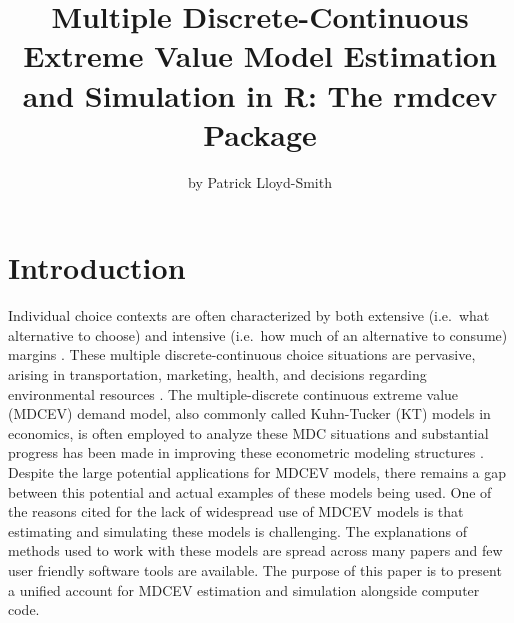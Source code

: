 \title{Multiple Discrete-Continuous Extreme Value Model Estimation and
Simulation in R: The rmdcev Package}
\author{by Patrick Lloyd-Smith}

\maketitle



\hypertarget{introduction}{%
\section{Introduction}\label{introduction}}

Individual choice contexts are often characterized by both extensive
(i.e.~what alternative to choose) and intensive (i.e.~how much of an
alternative to consume) margins \citep{bhatmultiple2008}. These multiple
discrete-continuous choice situations are pervasive, arising in
transportation, marketing, health, and decisions regarding environmental
resources \citep{bhatmultiple2014}. The multiple-discrete continuous
extreme value (MDCEV) demand model, also commonly called Kuhn-Tucker
(KT) models in economics, is often employed to analyze these MDC
situations and substantial progress has been made in improving these
econometric modeling structures
\citep{vonhaefenkuhn-tucker2005, bhatmultiple2014}. Despite the large
potential applications for MDCEV models, there remains a gap between
this potential and actual examples of these models being used. One of
the reasons cited for the lack of widespread use of MDCEV models is that
estimating and simulating these models is challenging. The explanations
of methods used to work with these models are spread across many papers
and few user friendly software tools are available. The purpose of this
paper is to present a unified account for MDCEV estimation and
simulation alongside computer code.

